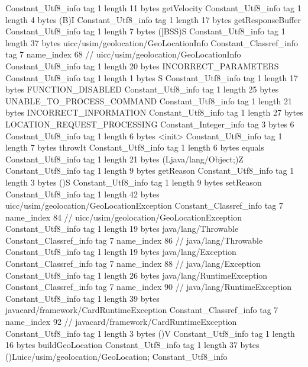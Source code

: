 {{{		}
		Constant_Utf8_info {
			tag	1
			length	11
			bytes	getVelocity
		}
		Constant_Utf8_info {
			tag	1
			length	4
			bytes	(B)I
		}
		Constant_Utf8_info {
			tag	1
			length	17
			bytes	getResponseBuffer
		}
		Constant_Utf8_info {
			tag	1
			length	7
			bytes	([BSS)S
		}
		Constant_Utf8_info {
			tag	1
			length	37
			bytes	uicc/usim/geolocation/GeoLocationInfo
		}
		Constant_Classref_info {
			tag	7
			name_index	68		// uicc/usim/geolocation/GeoLocationInfo
		}
		Constant_Utf8_info {
			tag	1
			length	20
			bytes	INCORRECT_PARAMETERS
		}
		Constant_Utf8_info {
			tag	1
			length	1
			bytes	S
		}
		Constant_Utf8_info {
			tag	1
			length	17
			bytes	FUNCTION_DISABLED
		}
		Constant_Utf8_info {
			tag	1
			length	25
			bytes	UNABLE_TO_PROCESS_COMMAND
		}
		Constant_Utf8_info {
			tag	1
			length	21
			bytes	INCORRECT_INFORMATION
		}
		Constant_Utf8_info {
			tag	1
			length	27
			bytes	LOCATION_REQUEST_PROCESSING
		}
		Constant_Integer_info {
			tag	3
			bytes	6
		}
		Constant_Utf8_info {
			tag	1
			length	6
			bytes	<init>
		}
		Constant_Utf8_info {
			tag	1
			length	7
			bytes	throwIt
		}
		Constant_Utf8_info {
			tag	1
			length	6
			bytes	equals
		}
		Constant_Utf8_info {
			tag	1
			length	21
			bytes	(Ljava/lang/Object;)Z
		}
		Constant_Utf8_info {
			tag	1
			length	9
			bytes	getReason
		}
		Constant_Utf8_info {
			tag	1
			length	3
			bytes	()S
		}
		Constant_Utf8_info {
			tag	1
			length	9
			bytes	setReason
		}
		Constant_Utf8_info {
			tag	1
			length	42
			bytes	uicc/usim/geolocation/GeoLocationException
		}
		Constant_Classref_info {
			tag	7
			name_index	84		// uicc/usim/geolocation/GeoLocationException
		}
		Constant_Utf8_info {
			tag	1
			length	19
			bytes	java/lang/Throwable
		}
		Constant_Classref_info {
			tag	7
			name_index	86		// java/lang/Throwable
		}
		Constant_Utf8_info {
			tag	1
			length	19
			bytes	java/lang/Exception
		}
		Constant_Classref_info {
			tag	7
			name_index	88		// java/lang/Exception
		}
		Constant_Utf8_info {
			tag	1
			length	26
			bytes	java/lang/RuntimeException
		}
		Constant_Classref_info {
			tag	7
			name_index	90		// java/lang/RuntimeException
		}
		Constant_Utf8_info {
			tag	1
			length	39
			bytes	javacard/framework/CardRuntimeException
		}
		Constant_Classref_info {
			tag	7
			name_index	92		// javacard/framework/CardRuntimeException
		}
		Constant_Utf8_info {
			tag	1
			length	3
			bytes	()V
		}
		Constant_Utf8_info {
			tag	1
			length	16
			bytes	buildGeoLocation
		}
		Constant_Utf8_info {
			tag	1
			length	37
			bytes	()Luicc/usim/geolocation/GeoLocation;
		}
		Constant_Utf8_info {
}}}
